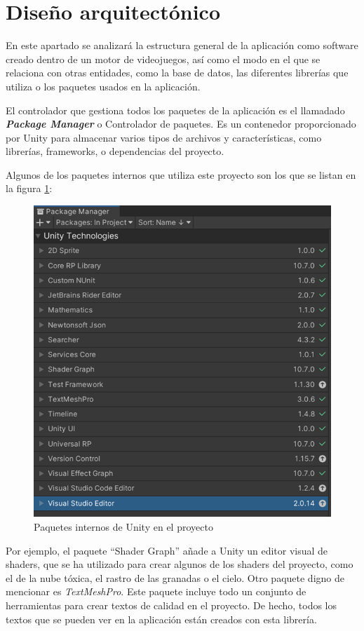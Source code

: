 \section{Diseño arquitectónico}
En este apartado se analizará la estructura general de la aplicación como software creado dentro de un motor de videojuegos, así como el modo en el que se relaciona con otras entidades, como la base de datos, las diferentes librerías que utiliza o los paquetes usados en la aplicación.

El controlador que gestiona todos los paquetes de la aplicación es el llamadado \textbf{\textit{Package Manager}} \cite{doc:PackageManager} o Controlador de paquetes. Es un contenedor proporcionado por Unity para almacenar varios tipos de archivos y características, como librerías, frameworks, o dependencias del proyecto.

Algunos de los paquetes internos que utiliza este proyecto son los que se listan en la  figura \ref{fig:Paquetes internos}:
\begin{figure}[h]
    \centering
    \includegraphics[scale=0.45]{img/PackagesUnity.png}
    \caption{Paquetes internos de Unity en el proyecto}
    \label{fig:Paquetes internos}
    \end{figure}
    
Por ejemplo, el paquete ``Shader Graph'' añade a Unity un editor visual de shaders, que se ha utilizado para crear algunos de los shaders del proyecto, como el de la nube tóxica, el rastro de las granadas o el cielo. Otro paquete digno de mencionar es \textit{TextMeshPro}. Este paquete incluye todo un conjunto de herramientas para crear textos de calidad en el proyecto. De hecho, todos los textos que se pueden ver en la aplicación están creados con esta librería.

